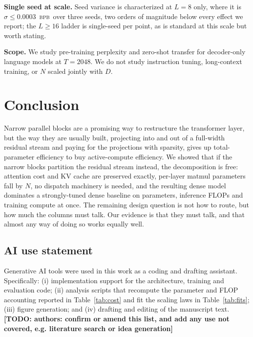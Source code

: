 \documentclass{article}
\newcommand{\TODO}[1]{{\color{red}\textbf{[TODO: #1]}}}
\newcommand{\bpb}{\textsc{bpb}}
\newcommand{\dmodel}{D}
\newcommand{\nsub}{N}
\begin{document}
\textbf{Single seed at scale.} Seed variance is characterized at $L{=}8$ only,
where it is $\sigma \le 0.0003$~\bpb\ over three seeds, two orders of magnitude
below every effect we report; the $L\ge16$ ladder is single-seed per point, as is
standard at this scale but worth stating.

\textbf{Scope.} We study pre-training perplexity and zero-shot transfer for
decoder-only language models at $T{=}2048$. We do not study instruction tuning,
long-context training, or $\nsub$ scaled jointly with $\dmodel$.

\section{Conclusion}

Narrow parallel blocks are a promising way to restructure the transformer layer,
but the way they are usually built, projecting into and out of a full-width
residual stream and paying for the projections with sparsity, gives up
total-parameter efficiency to buy active-compute efficiency. We showed that if the
narrow blocks partition the residual stream instead, the decomposition is free:
attention cost and KV cache are preserved exactly, per-layer matmul parameters
fall by $\nsub$, no dispatch machinery is needed, and the resulting dense model
dominates a strongly-tuned dense baseline on parameters, inference FLOPs and
training compute at once. The remaining design question is not how to route, but
how much the columns must talk. Our evidence is that they must talk, and that
almost any way of doing so works equally well.


\subsection*{AI use statement}

Generative AI tools were used in this work as a coding and drafting assistant.
Specifically: (i) implementation support for the architecture, training and
evaluation code; (ii) analysis scripts that recompute the parameter and FLOP
accounting reported in Table~\ref{tab:cost} and fit the scaling laws in
Table~\ref{tab:fits}; (iii) figure generation; and (iv) drafting and editing of
the manuscript text. \TODO{authors: confirm or amend this list, and add any use
not covered, e.g. literature search or idea generation}
\end{document}
